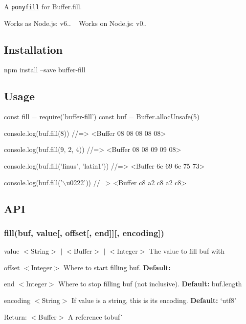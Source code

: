 A \href{https://ponyfill.com}{\tt ponyfill} for {\ttfamily Buffer.\+fill}.

Works as Node.\+js\+: {\ttfamily v6..} ~\newline
 Works on Node.\+js\+: {\ttfamily v0..}

\subsection*{Installation}


\begin{DoxyCode}
npm install --save buffer-fill
\end{DoxyCode}


\subsection*{Usage}


\begin{DoxyCode}
const fill = require('buffer-fill')
const buf = Buffer.allocUnsafe(5)

console.log(buf.fill(8))
//=> <Buffer 08 08 08 08 08>

console.log(buf.fill(9, 2, 4))
//=> <Buffer 08 08 09 09 08>

console.log(buf.fill('linus', 'latin1'))
//=> <Buffer 6c 69 6e 75 73>

console.log(buf.fill('\(\backslash\)u0222'))
//=> <Buffer c8 a2 c8 a2 c8>
\end{DoxyCode}


\subsection*{A\+PI}

\subsubsection*{fill(buf, value\mbox{[}, offset\mbox{[}, end\mbox{]}\mbox{]}\mbox{[}, encoding\mbox{]})}


\begin{DoxyItemize}
\item {\ttfamily value} $<$String$>$ $\vert$ $<$Buffer$>$ $\vert$ $<$Integer$>$ The value to fill {\ttfamily buf} with
\item {\ttfamily offset} $<$Integer$>$ Where to start filling {\ttfamily buf}. {\bfseries Default\+:} {}
\item {\ttfamily end} $<$Integer$>$ Where to stop filling {\ttfamily buf} (not inclusive). {\bfseries Default\+:} {\ttfamily buf.\+length}
\item {\ttfamily encoding} $<$String$>$ If {\ttfamily value} is a string, this is its encoding. {\bfseries Default\+:} `\textquotesingle{}utf8'{\ttfamily }
\item {\ttfamily Return\+: $<$Buffer$>$ A reference to}buf\`{}
\end{DoxyItemize}

